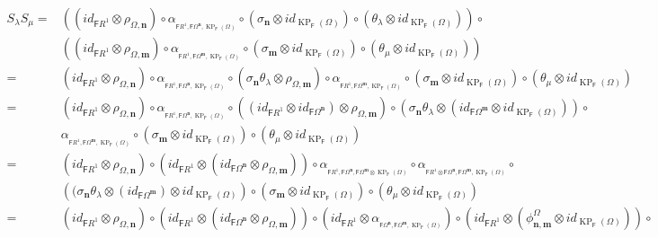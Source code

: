 \documentclass[12pt]{amsart}
\newcommand{\N}{\mathbf{n}}
\newcommand{\M}{\mathbf{m}}
\newcommand{\KP}{\operatorname{KP}}
\theoremstyle{definition}
\theoremstyle{remark}
\begin{document}
{\allowdisplaybreaks
\begin{align*}
    S_\lambda S_\mu=& \left(\left(id_{\mathsf{F}R^1}\otimes \rho_{\Omega,\N}\right)\circ \alpha_{_{\mathsf{F}R^1,\mathsf{F}\Omega^\N,\KP_\mathsf{F}(\Omega)}}\circ \left(\sigma_\N\otimes id_{\KP_\mathsf{F}(\Omega)}\right)\circ \left(\theta_\lambda\otimes id_{\KP_\mathsf{F}(\Omega)}\right)\right)\circ\\ &\left(\left(id_{\mathsf{F}R^1}\otimes \rho_{\Omega,\M}\right)\circ \alpha_{_{\mathsf{F}R^1,\mathsf{F}\Omega^\M,\KP_\mathsf{F}(\Omega)}}\circ \left(\sigma_\M\otimes id_{\KP_\mathsf{F}(\Omega)}\right)\circ \left(\theta_\mu\otimes id_{\KP_\mathsf{F}(\Omega)}\right)\right)\\
    =& \left(id_{\mathsf{F}R^1}\otimes \rho_{\Omega,\N}\right)\circ \alpha_{_{\mathsf{F}R^1,\mathsf{F}\Omega^\N,\KP_\mathsf{F}(\Omega)}}\circ \left(\sigma_\N\theta_\lambda\otimes \rho_{\Omega,\M}\right) \circ \alpha_{_{\mathsf{F}R^1,\mathsf{F}\Omega^\M,\KP_\mathsf{F}(\Omega)}}\circ \left(\sigma_\M\otimes id_{\KP_\mathsf{F}(\Omega)}\right)\circ \left(\theta_\mu\otimes id_{\KP_\mathsf{F}(\Omega)}\right)\\
    =& \left(id_{\mathsf{F}R^1}\otimes \rho_{\Omega,\N}\right)\circ \alpha_{_{\mathsf{F}R^1,\mathsf{F}\Omega^\N,\KP_\mathsf{F}(\Omega)}}\circ \left((id_{\mathsf{F}R^1}\otimes id_{\mathsf{F}\Omega^\N})\otimes \rho_{\Omega,\M}\right)\circ \left(\sigma_\N\theta_\lambda\otimes (id_{\mathsf{F}\Omega^\M}\otimes id_{\KP_\mathsf{F}(\Omega)})\right)\circ\\  &\alpha_{_{\mathsf{F}R^1,\mathsf{F}\Omega^\M,\KP_\mathsf{F}(\Omega)}}\circ \left(\sigma_\M\otimes id_{\KP_\mathsf{F}(\Omega)}\right)\circ \left(\theta_\mu\otimes id_{\KP_\mathsf{F}(\Omega)}\right)\\
    =& \left(id_{\mathsf{F}R^1}\otimes \rho_{\Omega,\N}\right)\circ \left(id_{\mathsf{F}R^1}\otimes (id_{\mathsf{F}\Omega^\N}\otimes \rho_{\Omega,\M})\right)\circ \alpha_{_{\mathsf{F}R^1,\mathsf{F}\Omega^\N,\mathsf{F}\Omega^\M\otimes \KP_\mathsf{F}(\Omega)}}\circ \alpha_{_{\mathsf{F}R^1\otimes \mathsf{F}\Omega^\N,\mathsf{F}\Omega^\M,\KP_\mathsf{F}(\Omega)}}\circ\\
    &\left((\sigma_\N\theta_\lambda\otimes (id_{\mathsf{F}\Omega^\M})\otimes id_{\KP_\mathsf{F}(\Omega)}\right)\circ \left(\sigma_\M\otimes id_{\KP_\mathsf{F}(\Omega)}\right)\circ \left(\theta_\mu\otimes id_{\KP_\mathsf{F}(\Omega)}\right)\\
    =& \left(id_{\mathsf{F}R^1}\otimes \rho_{\Omega,\N}\right)\circ \left(id_{\mathsf{F}R^1}\otimes (id_{\mathsf{F}\Omega^\N}\otimes \rho_{\Omega,\M})\right)\circ \left(id_{\mathsf{F}R^1}\otimes \alpha_{_{\mathsf{F}\Omega^\N,\mathsf{F}\Omega^\M,\KP_\mathsf{F}(\Omega)}}\right)\circ \left(id_{\mathsf{F}R^1}\otimes (\phi_{\N,\M}^\Omega\otimes id_{\KP_\mathsf{F}(\Omega)})\right)\circ\\

\end{align*}}
\end{document}
